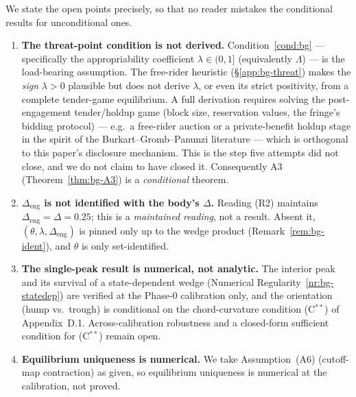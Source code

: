 We state the open points precisely, so that no reader mistakes the conditional
results for unconditional ones.
\begin{enumerate}[label=(O\arabic*),leftmargin=2.6em]
\item \textbf{The threat-point condition is not derived.} Condition~\ref{cond:bg}
  --- specifically the appropriability coefficient $\lambda\in(0,1]$
  (equivalently $\Lambda$) --- is the load-bearing assumption. The free-rider
  heuristic (\S\ref{app:bg-threat}) makes the \emph{sign} $\lambda>0$ plausible
  but does not derive $\lambda$, or even its strict positivity, from a complete
  tender-game equilibrium. A full derivation requires solving the post-engagement
  tender/holdup game (block size, reservation values, the fringe's bidding
  protocol) --- e.g.\ a \citet{GrossmanHart1980} free-rider auction or a
  private-benefit holdup stage in the spirit of the Burkart--Gromb--Panunzi
  literature --- which is orthogonal to this
  paper's disclosure mechanism. This is the step five attempts did not close, and
  we do not claim to have closed it. Consequently A3 (Theorem~\ref{thm:bg-A3}) is
  a \emph{conditional} theorem.
\item \textbf{$\Delta_{\mathrm{eng}}$ is not identified with the body's $\Delta$.}
  Reading (R2) maintains $\Delta_{\mathrm{eng}}=\Delta=0.25$; this is a
  \emph{maintained reading}, not a result. Absent it, $(\theta,\lambda,
  \Delta_{\mathrm{eng}})$ is pinned only up to the wedge product
  (Remark~\ref{rem:bg-ident}), and $\theta$ is only set-identified.
\item \textbf{The single-peak result is numerical, not analytic.} The interior
  peak and its survival of a state-dependent wedge (Numerical
  Regularity~\ref{nr:bg-statedep}) are verified at the Phase-0 calibration only,
  and the orientation (hump vs.\ trough) is conditional on the chord-curvature
  condition (C$^{\ast\ast}$) of Appendix~D.1. Across-calibration robustness and a
  closed-form sufficient condition for (C$^{\ast\ast}$) remain open.
\item \textbf{Equilibrium uniqueness is numerical.} We take
  Assumption~\textup{(A6)} (cutoff-map contraction) as given, so equilibrium
  uniqueness is numerical at the calibration, not proved.
\end{enumerate}

